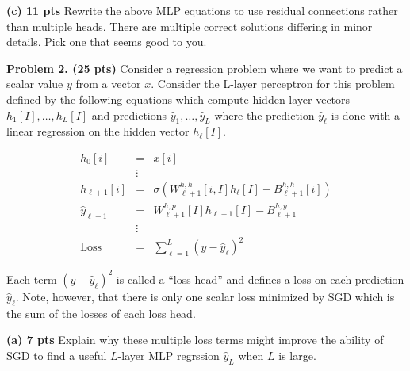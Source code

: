 \documentclass{article}
\newcommand{\solution}[1]{}
\begin{document}
\medskip
{\bf (c) 11 pts} Rewrite the above MLP equations to use residual connections rather than multiple heads.  There are multiple correct solutions differing in minor details.  Pick one that seems
good to you.

\solution{
\begin{eqnarray*}
  h_0[i] & = & x[i] \\
  & \vdots & \\
  \tilde{h}_{\ell+1}[i] & = & \sigma(W^{h,h}_{\ell+1}[i,I]h_\ell[I] - B^{h,h}_{\ell+1}[i]) \\
  h_{\ell+1}[i] & = & \tilde{h}_{\ell+1}[i] + h_\ell[i] \\
  & \vdots & \\
  \hat{y} & = & W^{h,y}[I]h_L[I]- B^{h,y} \\
  \mathrm{Loss} & = & (y - \hat{y})^2
\end{eqnarray*}
}

\medskip

{\bf Problem 2. (25 pts)}  Consider a regression problem where we want to predict a scalar value $y$ from a vector $x$.
Consider the L-layer perceptron for this problem defined by the following equations
which compute hidden layer vectors $h_1[I], \ldots, h_L[I]$ and predictions $\hat{y}_1, \ldots, \hat{y}_L$ where
the prediction $\hat{y}_\ell$ is done with a linear regression on the hidden vector $h_\ell[I]$.

\begin{eqnarray*}
  h_0[i] & = & x[i] \\
  & \vdots & \\
  h_{\ell+1}[i] & = & \sigma(W^{h,h}_{\ell+1}[i,I]h_\ell[I] - B^{h,h}_{\ell+1}[i]) \\
  \hat{y}_{\ell +1} & = & W^{h,p}_{\ell+1}[I]h_{\ell+1}[I]- B^{h,y}_{\ell+1} \\
  & \vdots & \\
  \mathrm{Loss} & = & \sum_{\ell = 1}^L (y - \hat{y}_\ell)^2
\end{eqnarray*}

Each term $(y-\hat{y}_\ell)^2$ is called a ``loss head'' and defines a loss on each prediction $\hat{y}_{\ell}$.
Note, however, that there is only one scalar loss minimized by SGD which is the sum of the losses of each loss head.

\medskip
{\bf (a) 7 pts} Explain why these multiple loss terms might improve the ability of SGD to find a useful $L$-layer MLP regrssion $\hat{y}_L$ when $L$ is large.

\solution{
  SGD on deep networks with the loss term only occuring at the final layer is not generally effective because the lower layers
  never get meaninful gradients.  Placing loss functions near the lower layers will cause the lower hidden layers to have meaningful
  gradients and produce informative features.
}
\end{document}
